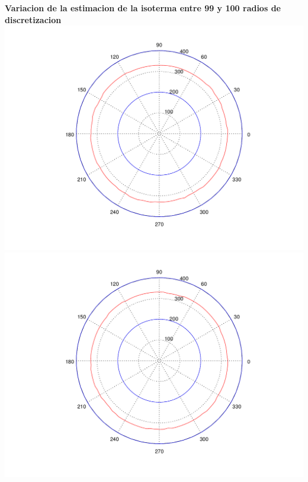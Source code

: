 \begin{enumerate}
 	\textbf{Variacion de la estimacion de la isoterma entre 99 y 100 radios de discretizacion}\\
	\includegraphics[scale=0.35]{experimentos1a_1b/evolucion_posicion_isoterma_temperatura/test2/test6_099_radios_inst_001_isomap.png}
	\includegraphics[scale=0.35]{experimentos1a_1b/evolucion_posicion_isoterma_temperatura/test2/test6_100_radios_inst_001_isomap.png}
	

\end{enumerate}
